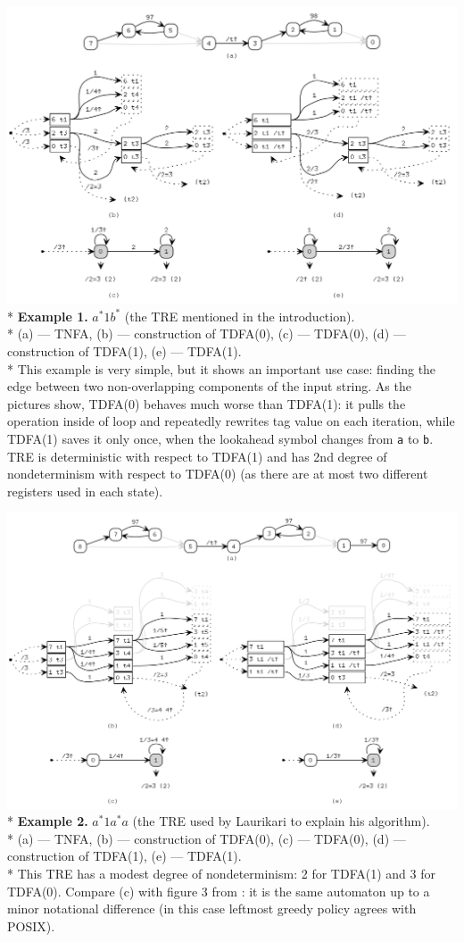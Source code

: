 \documentclass{article}
\newenvironment{Xfig}
    {\par\medskip\noindent\minipage{\linewidth}\begin{center}}
    {\end{center}\endminipage\par\medskip}
\theoremstyle{definition}
\begin{document}
\begin{Xfig}
\includegraphics[width=0.9\linewidth]{img/example1_all.png}\\*
\textbf{Example 1.} $a^* 1 b^*$ (the TRE mentioned in the introduction).\\*
(a) --- TNFA, (b) --- construction of TDFA(0), (c) --- TDFA(0), (d) --- construction of TDFA(1), (e) --- TDFA(1).
\\*\medskip
This example is very simple, but it shows an important use case:
finding the edge between two non-overlapping components of the input string.
As the pictures show, TDFA(0) behaves much worse than TDFA(1):
it pulls the operation inside of loop and repeatedly rewrites tag value on each iteration,
while TDFA(1) saves it only once, when the lookahead symbol changes from \texttt{a} to \texttt{b}.
TRE is deterministic with respect to TDFA(1)
and has 2nd degree of nondeterminism with respect to TDFA(0)
(as there are at most two different registers used in each state).
\end{Xfig}

\begin{Xfig}
\includegraphics[width=0.9\linewidth]{img/example2_all.png}\\*
\textbf{Example 2.} $a^* 1 a^* a$ (the TRE used by Laurikari to explain his algorithm).\\*
(a) --- TNFA, (b) --- construction of TDFA(0), (c) --- TDFA(0), (d) --- construction of TDFA(1), (e) --- TDFA(1).\\*
This TRE has a modest degree of nondeterminism: 2 for TDFA(1) and 3 for TDFA(0).
Compare (c) with figure 3 from \cite{Lau00}: it is the same automaton up to a minor notational difference
(in this case leftmost greedy policy agrees with POSIX).
\end{Xfig}
\end{document}
